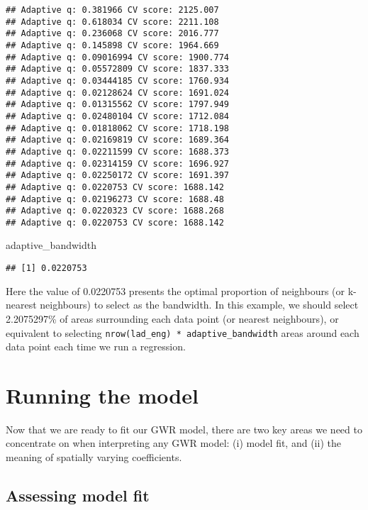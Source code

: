 \documentclass[
]{book}
\newenvironment{Shaded}{\begin{snugshade}}{\end{snugshade}}
\newcommand{\NormalTok}[1]{#1}
\begin{document}
\begin{verbatim}
## Adaptive q: 0.381966 CV score: 2125.007 
## Adaptive q: 0.618034 CV score: 2211.108 
## Adaptive q: 0.236068 CV score: 2016.777 
## Adaptive q: 0.145898 CV score: 1964.669 
## Adaptive q: 0.09016994 CV score: 1900.774 
## Adaptive q: 0.05572809 CV score: 1837.333 
## Adaptive q: 0.03444185 CV score: 1760.934 
## Adaptive q: 0.02128624 CV score: 1691.024 
## Adaptive q: 0.01315562 CV score: 1797.949 
## Adaptive q: 0.02480104 CV score: 1712.084 
## Adaptive q: 0.01818062 CV score: 1718.198 
## Adaptive q: 0.02169819 CV score: 1689.364 
## Adaptive q: 0.02211599 CV score: 1688.373 
## Adaptive q: 0.02314159 CV score: 1696.927 
## Adaptive q: 0.02250172 CV score: 1691.397 
## Adaptive q: 0.0220753 CV score: 1688.142 
## Adaptive q: 0.02196273 CV score: 1688.48 
## Adaptive q: 0.0220323 CV score: 1688.268 
## Adaptive q: 0.0220753 CV score: 1688.142
\end{verbatim}

\begin{Shaded}
\begin{Highlighting}[]
\NormalTok{adaptive\_bandwidth}
\end{Highlighting}
\end{Shaded}

\begin{verbatim}
## [1] 0.0220753
\end{verbatim}

Here the value of 0.0220753 presents the optimal proportion of neighbours (or k-nearest neighbours) to select as the bandwidth. In this example, we should select 2.2075297\% of areas surrounding each data point (or nearest neighbours), or equivalent to selecting \texttt{nrow(lad\_eng)\ *\ adaptive\_bandwidth} areas around each data point each time we run a regression.

\hypertarget{running-the-model}{%
\section{Running the model}\label{running-the-model}}

Now that we are ready to fit our GWR model, there are two key areas we need to concentrate on when interpreting any GWR model: (i) model fit, and (ii) the meaning of spatially varying coefficients.

\hypertarget{assessing-model-fit}{%
\subsection{Assessing model fit}\label{assessing-model-fit}}
\end{document}
